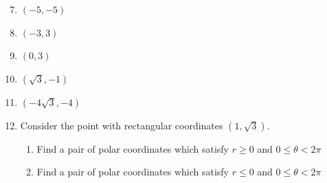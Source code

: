\documentclass[12pt]{article}
\newif\ifans
\begin{document}
\newpage


\begin{enumerate}
\setcounter{enumi}{6}

\item $(-5, -5)$ 

\ifans{\fbox{I. $\left(5\sqrt{2},\frac{5\pi}{4}\right)$; II. $\left(5\sqrt{2},-\frac{3\pi}{4}\right)$}} \fi

\item $(-3, 3)$ 

\ifans{\fbox{I. $\left(3\sqrt{2},\frac{3\pi}{4}\right)$; II. $\left(3\sqrt{2},-\frac{5\pi}{4}\right)$}} \fi

\item $(0,3)$ 

\ifans{\fbox{I. $\left(3,\frac{\pi}{2}\right)$; II. $\left(3,-\frac{3\pi}{2}\right)$}} \fi

\item $\left(\sqrt{3}, -1\right)$ 

\ifans{\fbox{I. $\left(2,\frac{11\pi}{6}\right)$; II. $\left(2,-\frac{\pi}{6}\right)$; Detailed Solution: \textcolor{blue}{\href{http://www.math.drexel.edu/classes/Calculus/resources/Math122HW/Solutions/122_18_Polar_10.pdf}{Here}}}} \fi

\item $\left(-4\sqrt{3}, -4\right)$ 

\ifans{\fbox{I. $\left(8,\frac{7\pi}{6}\right)$; II. $\left(8,-\frac{5\pi}{6}\right)$}} \fi

\item Consider the point with rectangular coordinates $\left(1,\sqrt{3}\right)$.

\begin{enumerate}

\item Find a pair of polar coordinates which satisfy $r \geq 0$ and $0 \leq \theta< 2\pi$

\ifans{\fbox{$(r,\theta)=\left(2,\frac{\pi}{3}\right)$}} \fi

\item Find a pair of polar coordinates which satisfy $r \leq 0$ and $0 \leq \theta <2\pi$

\ifans{\fbox{$(r,\theta)=\left(-2,\frac{4\pi}{3}\right)$}} \fi


\end{enumerate}
\end{enumerate}
\end{document}
